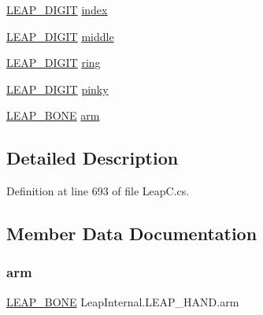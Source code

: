 \begin{DoxyCompactItemize}
\item 
\mbox{\hyperlink{struct_leap_internal_1_1_l_e_a_p___d_i_g_i_t}{L\+E\+A\+P\+\_\+\+D\+I\+G\+IT}} \mbox{\hyperlink{struct_leap_internal_1_1_l_e_a_p___h_a_n_d_acf37d60dfea09e1ef2cd3c916ceb644a}{index}}
\item 
\mbox{\hyperlink{struct_leap_internal_1_1_l_e_a_p___d_i_g_i_t}{L\+E\+A\+P\+\_\+\+D\+I\+G\+IT}} \mbox{\hyperlink{struct_leap_internal_1_1_l_e_a_p___h_a_n_d_a186dc21c6e974a904083a55356557740}{middle}}
\item 
\mbox{\hyperlink{struct_leap_internal_1_1_l_e_a_p___d_i_g_i_t}{L\+E\+A\+P\+\_\+\+D\+I\+G\+IT}} \mbox{\hyperlink{struct_leap_internal_1_1_l_e_a_p___h_a_n_d_a7b0b83407de8b6d222e033dcf3545aad}{ring}}
\item 
\mbox{\hyperlink{struct_leap_internal_1_1_l_e_a_p___d_i_g_i_t}{L\+E\+A\+P\+\_\+\+D\+I\+G\+IT}} \mbox{\hyperlink{struct_leap_internal_1_1_l_e_a_p___h_a_n_d_a190c6c4fa1523ceefe74cb9dba400e70}{pinky}}
\item 
\mbox{\hyperlink{struct_leap_internal_1_1_l_e_a_p___b_o_n_e}{L\+E\+A\+P\+\_\+\+B\+O\+NE}} \mbox{\hyperlink{struct_leap_internal_1_1_l_e_a_p___h_a_n_d_a4d9c22ee551be358ad39b825f7f68519}{arm}}
\end{DoxyCompactItemize}


\subsection{Detailed Description}


Definition at line 693 of file Leap\+C.\+cs.



\subsection{Member Data Documentation}
\mbox{\label{struct_leap_internal_1_1_l_e_a_p___h_a_n_d_a4d9c22ee551be358ad39b825f7f68519}} 
\subsubsection{\texorpdfstring{arm}{arm}}
{\footnotesize\ttfamily \mbox{\hyperlink{struct_leap_internal_1_1_l_e_a_p___b_o_n_e}{L\+E\+A\+P\+\_\+\+B\+O\+NE}} Leap\+Internal.\+L\+E\+A\+P\+\_\+\+H\+A\+N\+D.\+arm}



